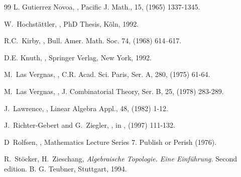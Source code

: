 \documentclass[a4paper]{amsart}
\theoremstyle{definition}
\theoremstyle{remark}
\begin{document}
\begin{thebibliography}{99}
 L. Gutierrez Novoa,
,
\newblock  Pacific J. Math., 15, (1965) 1337-1345.

 W.~Hochst\"attler,
,
\newblock PhD Thesis, K\"oln, 1992.

  R.C.~Kirby,
  ,
  \newblock Bull. Amer. Math. Soc. 74, (1968) 614--617. 

 D.E. Knuth,
,
\newblock Springer Verlag, New York, 1992.

 M.~Las Vergnas,
,
\newblock C.R. Acad. Sci. Paris, Ser. A, 280, (1975) 61-64.

 M.~Las Vergnas,
,
\newblock J. Combinatorial Theory, Ser. B, 25, (1978) 283-289.

 J.~Lawrence,
, 
\newblock Linear Algebra Appl., 48, (1982) 1-12.

 J.~Richter-Gebert and G.~Ziegler,
 ,
\newblock in \cite{gor}, (1997) 111-132.

  D~Rolfsen,
  ,
  \newblock Mathematics Lecture Series 7.
  \newblock Publish or Perish (1976).

R.~St\"ocker, H.~Zieschang,
\newblock \textit{Algebraische Topologie. Eine Einf\"uhrung.}
\newblock Second edition. 
\newblock B. G. Teubner, Stuttgart, 1994.

\end{thebibliography}
\end{document}
